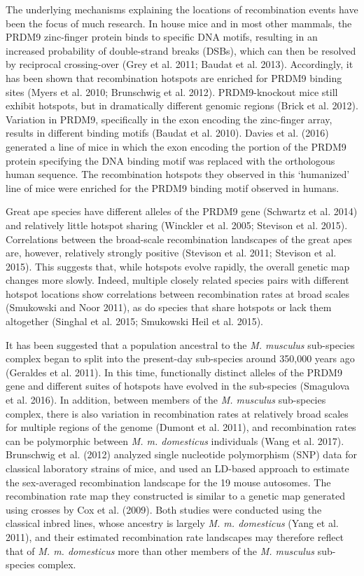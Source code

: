 The underlying mechanisms explaining the locations of recombination events have been the focus of much research. In house mice and in most other mammals, the PRDM9 zinc-finger protein binds to specific DNA motifs, resulting in an increased probability of double-strand breaks (DSBs), which can then be resolved by reciprocal crossing-over (Grey et al. 2011; Baudat et al. 2013). Accordingly, it has been shown that recombination hotspots are enriched for PRDM9 binding sites (Myers et al. 2010; Brunschwig et al. 2012). PRDM9-knockout mice still exhibit hotspots, but in dramatically different genomic regions (Brick et al. 2012). Variation in PRDM9, specifically in the exon encoding the zinc-finger array, results in different binding motifs (Baudat et al. 2010). Davies et al. (2016) generated a line of mice in which the exon encoding the portion of the PRDM9 protein specifying the DNA binding motif was replaced with the orthologous human sequence. The recombination hotspots they observed in this ‘humanized’ line of mice were enriched for the PRDM9 binding motif observed in humans. 

Great ape species have different alleles of the PRDM9 gene (Schwartz et al. 2014) and relatively little hotspot sharing (Winckler et al. 2005; Stevison et al. 2015). Correlations between the broad-scale recombination landscapes of the great apes are, however, relatively strongly positive (Stevison et al. 2011; Stevison et al. 2015). This suggests that, while hotspots evolve rapidly, the overall genetic map changes more slowly. Indeed, multiple closely related species pairs with different hotspot locations show correlations between recombination rates at broad scales (Smukowski and Noor 2011), as do species that share hotspots or lack them altogether (Singhal et al. 2015; Smukowski Heil et al. 2015).
 
It has been suggested that a population ancestral to the \emph{M. musculus} sub-species complex began to split into the present-day sub-species around 350,000 years ago (Geraldes et al. 2011). In this time, functionally distinct alleles of the PRDM9 gene and different suites of hotspots have evolved in the sub-species (Smagulova et al. 2016). In addition, between members of the \emph{M. musculus} sub-species complex, there is also variation in recombination rates at relatively broad scales for multiple regions of the genome (Dumont et al. 2011), and recombination rates can be polymorphic between \emph{M. m. domesticus} individuals (Wang et al. 2017). Brunschwig et al. (2012) analyzed single nucleotide polymorphism (SNP) data for classical laboratory strains of mice, and used an LD-based approach to estimate the sex-averaged recombination landscape for the 19 mouse autosomes. The recombination rate map they constructed is similar to a genetic map generated using crosses by Cox et al. (2009). Both studies were conducted using the classical inbred lines, whose ancestry is largely \emph{M. m. domesticus} (Yang et al. 2011), and their estimated recombination rate landscapes may therefore reflect that of \emph{M. m. domesticus} more than other members of the \emph{M. musculus} sub-species complex.
 
